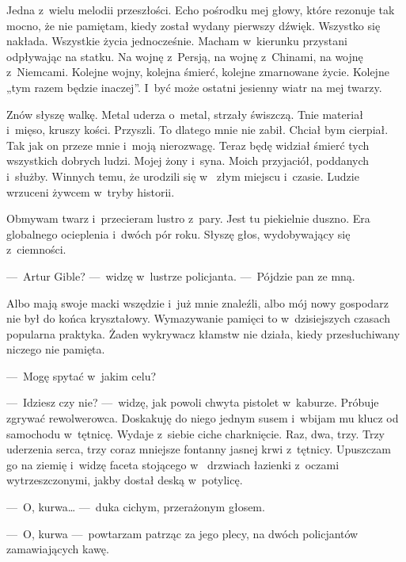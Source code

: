 Jedna z~wielu melodii przeszłości. Echo pośrodku mej głowy, które rezonuje tak mocno, że nie pamiętam, kiedy został 
wydany pierwszy dźwięk. Wszystko się nakłada. Wszystkie życia jednocześnie. Macham w~kierunku przystani odpływając na 
statku. Na wojnę z~Persją, na wojnę z~Chinami, na wojnę z~Niemcami. Kolejne wojny, kolejna śmierć, kolejne zmarnowane 
życie. Kolejne „tym razem będzie inaczej”. I~być może ostatni jesienny wiatr na mej twarzy.

Znów słyszę walkę. Metal uderza o~metal, strzały świszczą. Tnie materiał i~mięso, kruszy kości. Przyszli. To dlatego 
mnie nie zabił. Chciał bym cierpiał. Tak jak on przeze mnie i~moją nierozwagę. Teraz będę widział śmierć tych 
wszystkich dobrych ludzi. Mojej żony i~syna. Moich przyjaciół, poddanych i~służby. Winnych temu, że urodzili się w~
złym miejscu i~czasie. Ludzie wrzuceni żywcem w~tryby historii.

\paraSep

Obmywam twarz i~przecieram lustro z~pary. Jest tu piekielnie duszno. Era globalnego ocieplenia i~dwóch pór roku. 
Słyszę głos, wydobywający się z~ciemności.

---~Artur Gible? ---~widzę w~lustrze policjanta. ---~Pójdzie pan ze mną.

Albo mają swoje macki wszędzie i~już mnie znaleźli, albo mój nowy gospodarz nie był do końca kryształowy. Wymazywanie 
pamięci to w~dzisiejszych czasach popularna praktyka. Żaden wykrywacz kłamstw nie działa, kiedy przesłuchiwany 
niczego nie pamięta.

---~Mogę spytać w~jakim celu?

---~Idziesz czy nie? ---~widzę, jak powoli chwyta pistolet w~kaburze. Próbuje zgrywać rewolwerowca. Doskakuję do 
niego jednym susem i~wbijam mu klucz od samochodu w~tętnicę. Wydaje z~siebie ciche charknięcie. Raz, dwa, trzy. Trzy 
uderzenia serca, trzy coraz mniejsze fontanny jasnej krwi z~tętnicy. Upuszczam go na ziemię i~widzę faceta stojącego w
~drzwiach łazienki z~oczami wytrzeszczonymi, jakby dostał deską w~potylicę.

---~O, kurwa… ---~duka cichym, przerażonym głosem.

---~O, kurwa ---~powtarzam patrząc za jego plecy, na dwóch policjantów zamawiających kawę.
